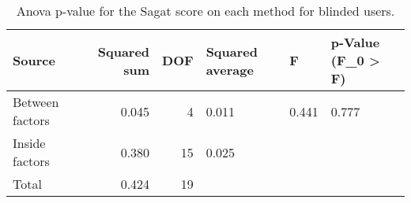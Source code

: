 
\begin{table}[!htb]
\centering
\caption{Anova p-value for the Sagat score on each method for blinded users.}
\label{tab:anova_sagat}
\begin{tabular}{lrrlll}
\toprule
         Source &  Squared sum &  DOF & Squared average &     F & p-Value (F\_0 > F) \\
\midrule
Between factors &        0.045 &    4 &           0.011 & 0.441 &             0.777 \\
 Inside factors &        0.380 &   15 &           0.025 &       &                   \\
          Total &        0.424 &   19 &                 &       &                   \\
\bottomrule
\end{tabular}
\end{table}

